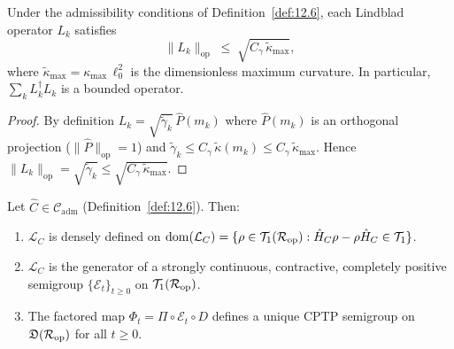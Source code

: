 \begin{lemma}\label{lem:12.1}
Under the admissibility conditions of Definition~\ref{def:12.6},
each Lindblad operator $L_k$ satisfies
\[
  \|L_k\|_{\mathrm{op}} \;\leq\; \sqrt{C_\gamma\,\tilde{\kappa}_{\max}},
\]
where $\tilde{\kappa}_{\max} = \kappa_{\max}\,\ell_0^2$ is the
dimensionless maximum curvature.  In particular,
$\sum_k L_k^\dagger L_k$ is a bounded operator.
\end{lemma}

\begin{proof}
By definition $L_k = \sqrt{\tilde{\gamma}_k}\,\hat{P}(m_k)$ where
$\hat{P}(m_k)$ is an orthogonal projection ($\|\hat{P}\|_{\mathrm{op}} = 1$)
and $\tilde{\gamma}_k \leq C_\gamma\,\tilde{\kappa}(m_k) \leq
C_\gamma\,\tilde{\kappa}_{\max}$.  Hence
$\|L_k\|_{\mathrm{op}} = \sqrt{\tilde{\gamma}_k} \leq
\sqrt{C_\gamma\,\tilde{\kappa}_{\max}}$.
\end{proof}

\begin{theorem}\label{thm:12.1}
Let $\hat{C} \in \mathcal{C}_{\mathrm{adm}}$ (Definition~\ref{def:12.6}).
Then:
\begin{enumerate}
  \item $\mathcal{L}_C$ is densely defined on
    $\mathrm{dom}(\mathcal{L}_C) = \{\rho \in \mathcal{T}_1(\mathcal{R}_{\mathrm{op}})
    : \hat{H}_C\rho - \rho\hat{H}_C \in \mathcal{T}_1\}$.
  \item $\mathcal{L}_C$ is the generator of a strongly continuous,
    contractive, completely positive semigroup
    $\{\mathcal{E}_t\}_{t \geq 0}$ on $\mathcal{T}_1(\mathcal{R}_{\mathrm{op}})$.
  \item The factored map $\Phi_t = \Pi \circ \mathcal{E}_t \circ D$
    defines a unique CPTP semigroup on
    $\mathfrak{D}(\mathcal{R}_{\mathrm{op}})$ for all $t \geq 0$.
\end{enumerate}
\end{theorem}

